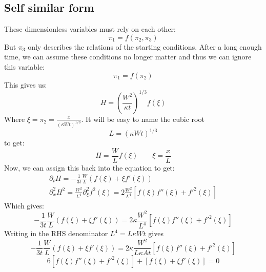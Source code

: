 \documentclass{article}
\begin{document}
\subsection{Self similar form}
These dimensionless variables must rely on each other:
\begin{equation}
    \pi_1 = f(\pi_2, \pi_3)
\end{equation}
But $\pi_3$ only describes the relations of the starting conditions. After a long enough time, we can assume these conditions no longer matter and thus we can ignore this variable:
\begin{equation}
    \pi_1 = f(\pi_2)
\end{equation}
This gives us:
\begin{equation}
    H = \left(\frac{W^2}{\kappa t}\right)^{1/3} f(\xi)
\end{equation}
Where $\xi = \pi_2 = \frac{x}{(\kappa W t)^{1/3}}$. It will be easy to name the cubic root
\begin{equation}
    L = (\kappa W t)^{1/3}
\end{equation}
to get:
\begin{equation}
    H = \frac{W}{L} f(\xi)
    \qquad
    \xi = \frac{x}{L}
\end{equation}
Now, we can assign this back into the equation to get:
\begin{equation}
\begin{gathered}
    \partial_t H = -\frac{1}{3t}\frac{W}{L} \left(f(\xi) + \xi f'(\xi)\right)
    \\
    \partial_x^2 H^2 = 
    \frac{W^2}{L^4} \partial_\xi^2 f^2(\xi) =
    2\frac{W^2}{L^4} \left[f(\xi)f''(\xi) + f'^2(\xi)\right]
\end{gathered}
\end{equation}
Which gives:
\begin{equation}
    -\frac{1}{3t}\frac{W}{L} \left(f(\xi) + \xi f'(\xi)\right) =  2\kappa\frac{W^2}{L^4} \left[f(\xi)f''(\xi) + f'^2(\xi)\right]
\end{equation}
Writing in the RHS denominator $L^4 = L\kappa W t$ gives
\begin{equation}
    -\frac{1}{3t}\frac{W}{L} \left(f(\xi) + \xi f'(\xi)\right) =  2\kappa\frac{W^2}{L\kappa At} \left[f(\xi)f''(\xi) + f'^2(\xi)\right]
\end{equation}
\begin{equation}
    \boxed{6\left[f(\xi)f''(\xi) + f'^2(\xi)\right] + \left[f(\xi) + \xi f'(\xi)\right] = 0}
\end{equation}
\end{document}
